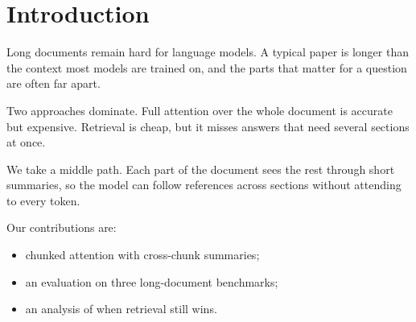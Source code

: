 \section{Introduction}
Long documents remain hard for language models.
A typical paper is longer than the context most models are trained on,
and the parts that matter for a question are often far apart.

Two approaches dominate.
Full attention over the whole document is accurate but expensive.
Retrieval is cheap, but it misses answers that need several sections at once.

We take a middle path.
Each part of the document sees the rest through short summaries,
so the model can follow references across sections without attending to every token.

Our contributions are:
\begin{itemize}
  \item chunked attention with cross-chunk summaries;
  \item an evaluation on three long-document benchmarks;
  \item an analysis of when retrieval still wins.
\end{itemize}
